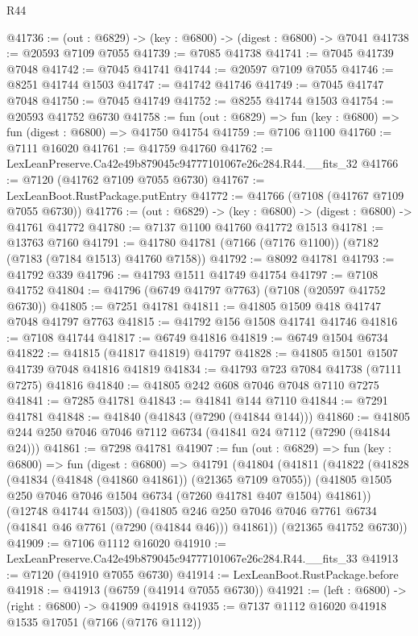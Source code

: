 \begin{lexlean}{R44}
\begin{coremodule}
{@41736 := (out : @6829) -> (key : @6800) -> (digest : @6800) -> @7041
@41738 := @20593 @7109 @7055
@41739 := @7085 @41738
@41741 := @7045 @41739 @7048
@41742 := @7045 @41741
@41744 := @20597 @7109 @7055
@41746 := @8251 @41744 @1503
@41747 := @41742 @41746
@41749 := @7045 @41747 @7048
@41750 := @7045 @41749
@41752 := @8255 @41744 @1503
@41754 := @20593 @41752 @6730
@41758 := fun (out : @6829) => fun (key : @6800) => fun (digest : @6800) => @41750 @41754
@41759 := @7106 @1100
@41760 := @7111 @16020
@41761 := @41759 @41760
@41762 := LexLeanPreserve.Ca42e49b879045c94777101067e26c284.R44.__fits_32
@41766 := @7120 (@41762 @7109 @7055 @6730)
@41767 := LexLeanBoot.RustPackage.putEntry
@41772 := @41766 (@7108 (@41767 @7109 @7055 @6730))
@41776 := (out : @6829) -> (key : @6800) -> (digest : @6800) -> @41761 @41772
@41780 := @7137 @1100 @41760 @41772 @1513
@41781 := @13763 @7160
@41791 := @41780 @41781 (@7166 (@7176 @1100)) (@7182 (@7183 (@7184 @1513) @41760 @7158))
@41792 := @8092 @41781
@41793 := @41792 @339
@41796 := @41793 @1511 @41749 @41754
@41797 := @7108 @41752
@41804 := @41796 (@6749 @41797 @7763) (@7108 (@20597 @41752 @6730))
@41805 := @7251 @41781
@41811 := @41805 @1509 @418 @41747 @7048 @41797 @7763
@41815 := @41792 @156 @1508 @41741 @41746
@41816 := @7108 @41744
@41817 := @6749 @41816
@41819 := @6749 @1504 @6734
@41822 := @41815 (@41817 @41819) @41797
@41828 := @41805 @1501 @1507 @41739 @7048 @41816 @41819
@41834 := @41793 @723 @7084 @41738 (@7111 @7275) @41816
@41840 := @41805 @242 @608 @7046 @7048 @7110 @7275
@41841 := @7285 @41781
@41843 := @41841 @144 @7110
@41844 := @7291 @41781
@41848 := @41840 (@41843 (@7290 (@41844 @144)))
@41860 := @41805 @244 @250 @7046 @7046 @7112 @6734 (@41841 @24 @7112 (@7290 (@41844 @24)))
@41861 := @7298 @41781
@41907 := fun (out : @6829) =>
  fun (key : @6800) =>
  fun (digest : @6800) =>
  @41791
    (@41804
      (@41811
        (@41822
          (@41828
            (@41834 (@41848 (@41860 @41861)) (@21365 @7109 @7055))
            (@41805 @1505 @250 @7046 @7046 @1504 @6734 (@7260 @41781 @407 @1504) @41861))
          (@12748 @41744 @1503))
        (@41805 @246 @250 @7046 @7046 @7761 @6734 (@41841 @46 @7761 (@7290 (@41844 @46))) @41861))
      (@21365 @41752 @6730))
@41909 := @7106 @1112 @16020
@41910 := LexLeanPreserve.Ca42e49b879045c94777101067e26c284.R44.__fits_33
@41913 := @7120 (@41910 @7055 @6730)
@41914 := LexLeanBoot.RustPackage.before
@41918 := @41913 (@6759 (@41914 @7055 @6730))
@41921 := (left : @6800) -> (right : @6800) -> @41909 @41918
@41935 := @7137
    @1112
    @16020
    @41918
    @1535
    @17051
    (@7166 (@7176 @1112))
}
\end{coremodule}
\end{lexlean}

